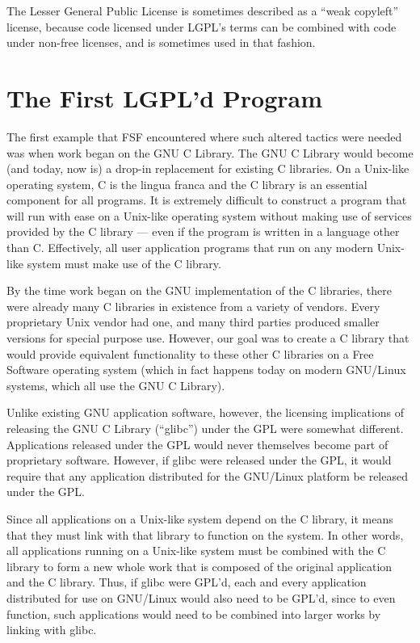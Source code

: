 
The Lesser General Public License is sometimes described as a ``weak copyleft''
license, because code licensed under LGPL’s terms can be combined with code
under non-free licenses, and is sometimes used in that fashion.
\section{The First LGPL'd Program}

The first example that FSF encountered where such altered tactics were
needed was when work began on the GNU C Library. The GNU C Library would
become (and today, now is) a drop-in replacement for existing C libraries.
On a Unix-like operating system, C is the lingua franca and the C library
is an essential component for all programs. It is extremely difficult to
construct a program that will run with ease on a Unix-like operating
system without making use of services provided by the C library --- even
if the program is written in a language other than C\@. Effectively, all
user application programs that run on any modern Unix-like system must
make use of the C library.

By the time work began on the GNU implementation of the C libraries, there
were already many C libraries in existence from a variety of vendors.
Every proprietary Unix vendor had one, and many third parties produced
smaller versions for special purpose use. However, our goal was to create
a C library that would provide equivalent functionality to these other C
libraries on a Free Software operating system (which in fact happens today
on modern GNU/Linux systems, which all use the GNU C Library).

Unlike existing GNU application software, however, the licensing
implications of releasing the GNU C Library (``glibc'') under the GPL were
somewhat different. Applications released under the GPL would never
themselves become part of proprietary software. However, if glibc were
released under the GPL, it would require that any application distributed for
the GNU/Linux platform be released under the GPL\@.

Since all applications on a Unix-like system depend on the C library, it
means that they must link with that library to function on the system. In
other words, all applications running on a Unix-like system must be
combined with the C library to form a new whole work that is
composed of the original application and the C library. Thus, if glibc
were GPL'd, each and every application distributed for use on GNU/Linux
would also need to be GPL'd, since to even function, such applications
would need to be combined into larger works by linking with
glibc.

